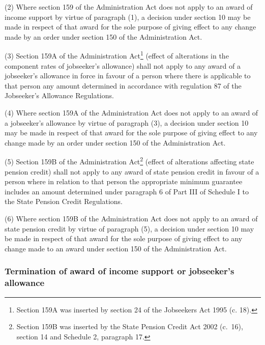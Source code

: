 \documentclass[12pt,a4paper]{article}
\begin{document}
(2) Where section 159 of the Administration Act does not apply to an award of income support by virtue of paragraph (1), a decision under section 10 may be made in respect of that award for the sole purpose of giving effect to any change made by an order under section 150 of the Administration Act.

(3) Section 159A of the Administration Act\footnote{\frenchspacing Section 159A was inserted by section 24 of the Jobseekers Act 1995 (c. 18).} (effect of alterations in the component rates of jobseeker’s allowance) shall not apply to any award of a jobseeker’s allowance in force in favour of a person where there is applicable to that person any amount determined in accordance with regulation 87 of the Jobseeker’s Allowance Regulations.

(4) Where section 159A of the Administration Act does not apply to an award of a jobseeker’s allowance by virtue of paragraph (3), a decision under section 10 may be made in respect of that award for the sole purpose of giving effect to any change made by an order under section 150 of the Administration Act.

(5) Section 159B of the Administration Act\footnote{Section 159B was inserted by the State Pension Credit Act 2002 (c.\ 16), section 14 and Schedule 2, paragraph 17.} (effect of alterations affecting state pension credit) shall not apply to any award of state pension credit in favour of a person where in relation to that person the appropriate minimum guarantee includes an amount determined under paragraph 6 of Part III of Schedule I to the State Pension Credit Regulations.

(6) Where section 159B of the Administration Act does not apply to an award of state pension credit by virtue of paragraph (5), a decision under section 10 may be made in respect of that award for the sole purpose of giving effect to any change made to an award under section 150 of the Administration Act.


\subsubsection[14A. Termination of award of income support or jobseeker’s allowance]{Termination of award of income support or jobseeker’s allowance}
\end{document}
